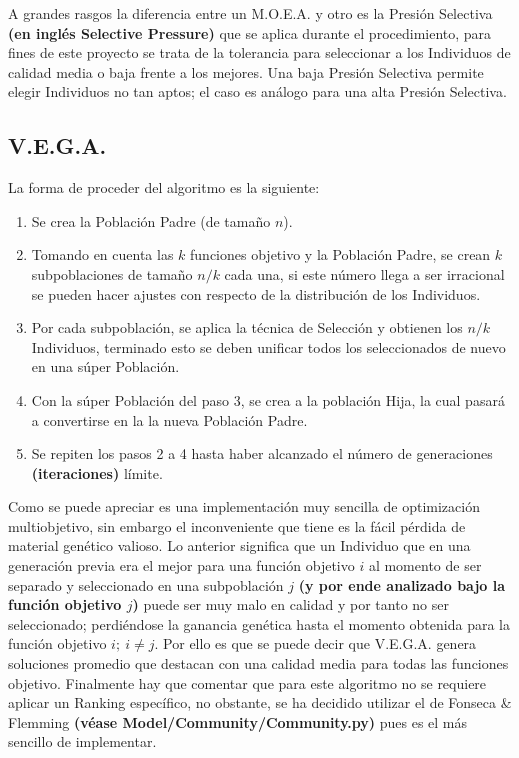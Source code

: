 \documentclass[class=report, crop=false]{standalone}
\begin{document}
A grandes rasgos la diferencia entre un M.O.E.A. y otro es la Presión Selectiva 
\textbf{(en inglés Selective Pressure)} que se aplica durante el procedimiento, para fines de este proyecto
se trata de la tolerancia para seleccionar a los Individuos de calidad media o baja frente a los
mejores. Una baja Presión Selectiva permite elegir Individuos no tan aptos; el caso es análogo para
una alta Presión Selectiva.



\subsection{V.E.G.A.}
La forma de proceder del algoritmo es la siguiente:

\begin{enumerate} 
\item Se crea la Población Padre (de tamaño \(n\)).
\item Tomando en cuenta las \(k\) funciones objetivo y la Población Padre, se crean \(k\) subpoblaciones de tamaño \(n/k\) cada una, si este número llega a ser irracional se pueden hacer ajustes con respecto de la distribución de los Individuos.
\item Por cada subpoblación, se aplica la técnica de Selección y obtienen los \(n/k\) Individuos, terminado esto se deben unificar todos los seleccionados de nuevo en una súper Población.
\item Con la súper Población del paso 3, se crea a la población Hija, la cual pasará a convertirse en la la nueva Población Padre.
\item Se repiten los pasos 2 a 4 hasta haber alcanzado el número de generaciones \textbf{(iteraciones)} límite.
\end{enumerate}

Como se puede apreciar es una implementación muy sencilla 
de optimización multiobjetivo, sin embargo el inconveniente 
que tiene es la fácil pérdida de material genético valioso.\break
Lo anterior significa que un Individuo que en una generación 
previa era el mejor para una función objetivo \(i\) al momento 
de ser separado y seleccionado en una subpoblación \(j\) \textbf{(y por ende analizado bajo la función objetivo \(j\))} 
puede ser muy malo en calidad y por tanto no ser seleccionado;
perdiéndose la ganancia genética hasta el momento obtenida para 
la función objetivo \(i;\ i \neq j\).\medskip\break
Por ello es que se puede decir que V.E.G.A. genera soluciones 
promedio que destacan con una calidad media para todas las 
funciones objetivo.\medskip\break
Finalmente hay que comentar que para este algoritmo no se requiere 
aplicar un Ranking específico, no obstante, se ha decidido utilizar 
el de Fonseca \& Flemming \textbf{(véase Model/Community/Community.py)} 
pues es el más sencillo de implementar.
\end{document}
